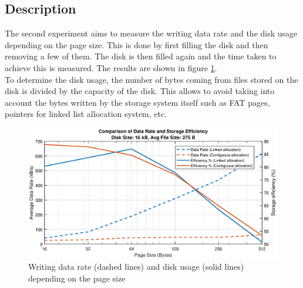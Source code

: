 \documentclass[10pt,a4paper]{ULBreport}
\begin{document}
\subsection{Description}
The second experiment aims to measure the writing data rate and the disk usage depending on the page size. This is done by first filling the disk and then removing a few of them. The disk is then filled again and the time taken to achieve this is measured. The results are shown in figure \ref{fig:normalOP}. \\
To determine the disk usage, the number of bytes coming from files stored on the disk is divided by the capacity of the disk. This allows to avoid taking into account the bytes written by the storage system itself such as FAT pages, pointers for linked list allocation system, etc. \\
\begin{figure}
    \centering
    \includegraphics[width=1\textwidth]{normalConditions.eps}
    \caption{Writing data rate (dashed lines) and disk usage (solid lines) depending on the page size}
    \label{fig:normalOP}
\end{figure}
\end{document}

